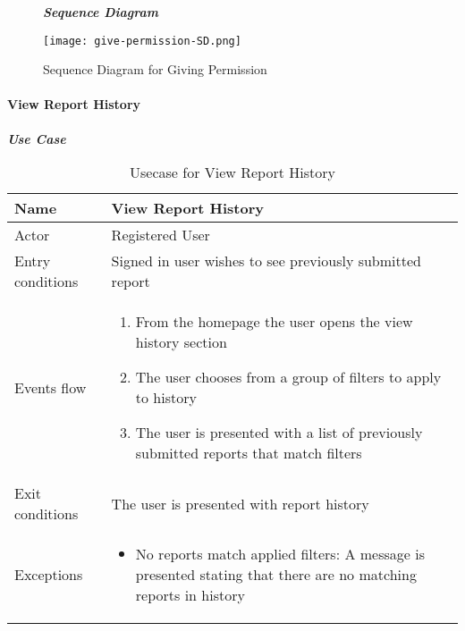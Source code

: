 \begin{figure}[H]
\begin{flushleft}\emph{\textbf{Sequence Diagram}}\end{flushleft}
\caption{Sequence Diagram for Giving Permission}
\label{fig:SD-Give-Permission}
\centering
\texttt{[image: give-permission-SD.png]}
\end{figure}

\paragraph{View Report History}
\hfill \break



\begin{table}[H]
\begin{flushleft}\emph{\textbf{Use Case}}\end{flushleft}
\footnotesize
\centering
\settowidth{}
\setlength\extrarowheight{2pt}
\begin{tabulary}{\textwidth}{|J|J|}
\hline
Name             & View Report History \\
\hline 
Actor            & Registered User \\ 
\hline 
Entry conditions & Signed in user wishes to see previously submitted report\\
\hline 
Events flow      & 
\begin{minipage}[t]{0.7\textwidth}
\begin{enumerate} 
\item From the homepage the user opens the view history section
\item The user chooses from a group of filters to apply to history
\item The user is presented with a list of previously submitted reports that match filters
\end{enumerate}
\end{minipage}\\
\hline
Exit conditions  & The user is presented with report history \\
\hline 
Exceptions       & 
\begin{minipage}[t]{0.8\textwidth}
\begin{itemize} 
\item No reports match applied filters: A message is presented stating that there are no matching reports in history
\end{itemize}
\end{minipage}\\
\hline
\end{tabulary}
\caption{\label{tab:Usecase-View-Report-History}Usecase for View Report History}
\end{table}

